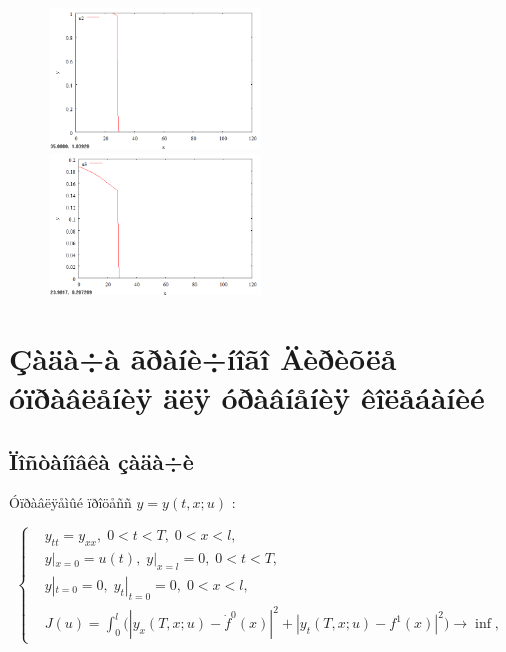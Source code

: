 \documentclass[14pt]{article}
\begin{document}
\begin{figure}
\begin{floatrow}
    {\includegraphics[width=0.5\textwidth]{task4_u2}}
    {\includegraphics[width=0.5\textwidth]{task4_u3}}
\end{floatrow}
\end{figure}


\newpage
\section{Çàäà÷à ãðàíè÷íîãî Äèðèõëå óïðàâëåíèÿ äëÿ óðàâíåíèÿ êîëåáàíèé}
\subsection{Ïîñòàíîâêà çàäà÷è}

Óïðàâëÿåìûé ïðîöåññ $ y = y(t,x; u)$ :

\begin{equation}\label{syst5}
\left\{ \begin{aligned}
& y_{tt} = y_{xx}, \;  0 < t < T, \; 0 < x < l, \\
& y|_{x=0} = u(t), \; y|_{x=l} = 0, \;  0 < t < T, \\
& y|_{t=0} = 0, \; y_t|_{t=0} = 0, \;  0 < x < l, \\
& J(u) = \int_0^l \Big( |y_x(T,x;u) - \dot{f}^{0}(x)|^2 + |y_t(T,x;u) - f^1(x)|^2  \Big)  \rightarrow \inf,
\end{aligned}\right.
\end{equation}
\end{document}
